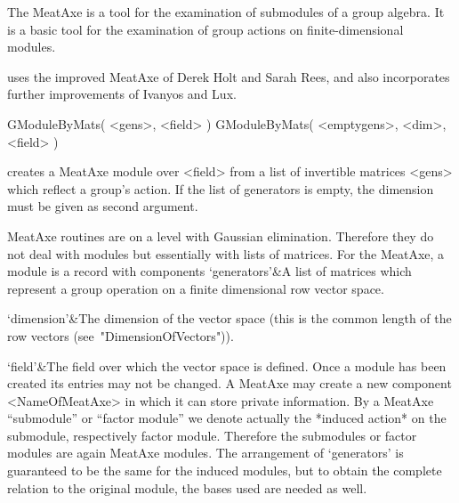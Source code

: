 

The MeatAxe \cite{Par84} is a tool for the examination of submodules of a
group algebra. It is a basic tool for the examination of group actions on
finite-dimensional modules.

{\GAP} uses the improved MeatAxe of Derek Holt and Sarah Rees, and
also incorporates further improvements of Ivanyos and Lux.



\>GModuleByMats( <gens>, <field> )
\>GModuleByMats( <emptygens>, <dim>, <field> )

creates a MeatAxe module over <field> from a list of invertible matrices 
<gens> which reflect a group's action. If the list of generators is empty,
the dimension must be given as second argument.

MeatAxe routines are on a level with Gaussian elimination. Therefore they do
not deal with {\GAP} modules but essentially with lists of matrices. For the
MeatAxe, a module is a record with components
\beginitems
`generators'&A list of matrices which represent a group operation on a
finite dimensional row vector space.

`dimension'&The dimension of the vector space (this is the common length of
the row vectors (see~"DimensionOfVectors")).

`field'&The field over which the vector space is defined.
\enditems
Once a module has been created its entries may not be changed. A MeatAxe may
create a new component <NameOfMeatAxe> in which it can store private
information. By a MeatAxe ``submodule'' or ``factor module'' we denote
actually the *induced action* on the submodule, respectively factor module.
Therefore the submodules or factor modules are again MeatAxe modules. The
arrangement of `generators' is guaranteed to be the same for the induced
modules, but to obtain the complete relation to the original module, the
bases used are needed as well.


